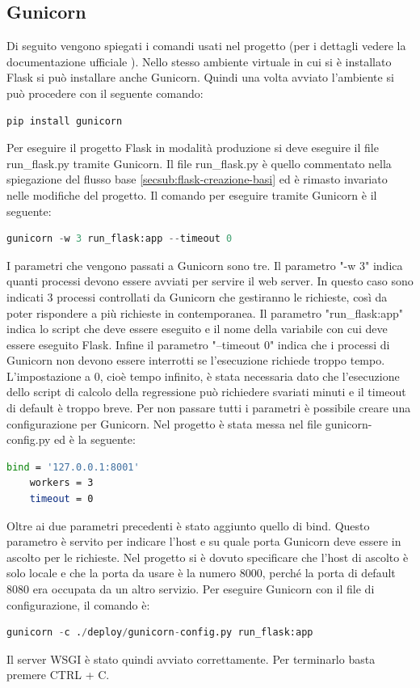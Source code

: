 \subsection{Gunicorn}
\label{secsub:flask-produzione-gunicorn}
Di seguito vengono spiegati i comandi usati nel progetto (per i dettagli vedere la documentazione ufficiale \cite{flask-doc-deploying-gunicorn}).
Nello stesso ambiente virtuale in cui si è installato Flask si può installare anche Gunicorn.
Quindi una volta avviato l'ambiente si può procedere con il seguente comando:
\begin{lstlisting}[language=python]
	pip install gunicorn
\end{lstlisting}
Per eseguire il progetto Flask in modalità produzione si deve eseguire il file run\_flask.py tramite Gunicorn.
Il file run\_flask.py è quello commentato nella spiegazione del flusso base \ref{secsub:flask-creazione-basi}
ed è rimasto invariato nelle modifiche del progetto.
Il comando per eseguire tramite Gunicorn è il seguente:
\begin{lstlisting}[language=python]
	gunicorn -w 3 run_flask:app --timeout 0
\end{lstlisting}
I parametri che vengono passati a Gunicorn sono tre.
Il parametro "-w 3" indica quanti processi devono essere avviati per servire il web server.
In questo caso sono indicati 3 processi controllati da Gunicorn che gestiranno le richieste,
così da poter rispondere a più richieste in contemporanea.
Il parametro "run\_flask:app" indica lo script che deve essere eseguito 
e il nome della variabile con cui deve essere eseguito Flask.
Infine il parametro "--timeout 0" indica che i processi di Gunicorn non devono essere interrotti
se l'esecuzione richiede troppo tempo.
L'impostazione a 0, cioè tempo infinito, è stata necessaria dato che l'esecuzione dello script 
di calcolo della regressione può richiedere svariati minuti e il timeout di default è troppo breve.\newline
Per non passare tutti i parametri è possibile creare una configurazione per Gunicorn.
Nel progetto è stata messa nel file gunicorn-config.py ed è la seguente:
\begin{lstlisting}[language=bash]
	bind = '127.0.0.1:8001'
	workers = 3
	timeout = 0
\end{lstlisting}
Oltre ai due parametri precedenti è stato aggiunto quello di bind.
Questo parametro è servito per indicare l'host e su quale porta Gunicorn deve essere in ascolto per le richieste.
Nel progetto si è dovuto specificare che l'host di ascolto è solo locale e che la porta da usare è la numero 8000, 
perché la porta di default 8080 era occupata da un altro servizio.\newline
Per eseguire Gunicorn con il file di configurazione, il comando è:
\begin{lstlisting}[language=python]
	gunicorn -c ./deploy/gunicorn-config.py run_flask:app
\end{lstlisting}
Il server WSGI è stato quindi avviato correttamente.
Per terminarlo basta premere CTRL + C.

